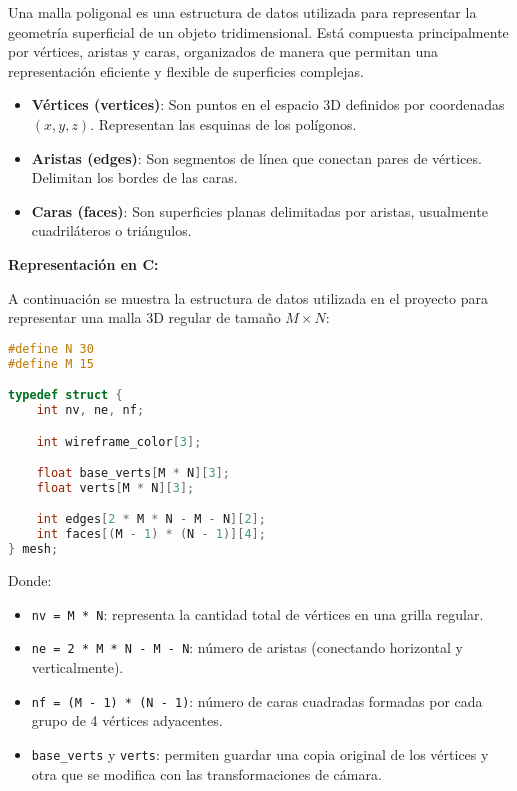 \documentclass[12pt]{article}
\begin{document}
    Una malla poligonal es una estructura de datos utilizada para representar la geometría superficial de un objeto tridimensional. Está compuesta principalmente por vértices, aristas y caras, organizados de manera que permitan una representación eficiente y flexible de superficies complejas.

    \begin{itemize}
        \item \textbf{Vértices (vertices)}: Son puntos en el espacio 3D definidos por coordenadas \( (x, y, z) \). Representan las esquinas de los polígonos.
        \item \textbf{Aristas (edges)}: Son segmentos de línea que conectan pares de vértices. Delimitan los bordes de las caras.
        \item \textbf{Caras (faces)}: Son superficies planas delimitadas por aristas, usualmente cuadriláteros o triángulos.
    \end{itemize}

    \textbf{Representación en C:}

    A continuación se muestra la estructura de datos utilizada en el proyecto para representar una malla 3D regular de tamaño \( M \times N \):

    \begin{lstlisting}[language=C, caption={Estructura de datos de la malla}]
#define N 30
#define M 15

typedef struct {
    int nv, ne, nf;

    int wireframe_color[3];

    float base_verts[M * N][3];
    float verts[M * N][3];

    int edges[2 * M * N - M - N][2];
    int faces[(M - 1) * (N - 1)][4];
} mesh;
    \end{lstlisting}

    Donde:
    \begin{itemize}
        \item \texttt{nv = M * N}: representa la cantidad total de vértices en una grilla regular.
        \item \texttt{ne = 2 * M * N - M - N}: número de aristas (conectando horizontal y verticalmente).
        \item \texttt{nf = (M - 1) * (N - 1)}: número de caras cuadradas formadas por cada grupo de 4 vértices adyacentes.
        \item \texttt{base\_verts} y \texttt{verts}: permiten guardar una copia original de los vértices y otra que se modifica con las transformaciones de cámara.
    \end{itemize}
\end{document}
